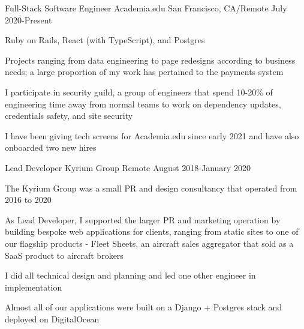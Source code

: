 

\begin{cventries}

  \cventry
    {Full-Stack Software Engineer}
    {Academia.edu}
    {San Francisco, CA/Remote}
    {July 2020-Present}
    {
      \begin{cvitems}
        \item {Ruby on Rails, React (with TypeScript), and Postgres}
        \item {
          Projects ranging from data engineering to page redesigns according to
          business needs; a large proportion of my work has pertained to the
          payments system
        }
        \item {
          I participate in security guild, a group of engineers that spend 10-20\% of
          engineering time away from normal teams to work on dependency updates,
          credentials safety, and site security
        }
        \item {
          I have been giving tech screens for Academia.edu since early 2021 and have also
          onboarded two new hires
        }
      \end{cvitems}
    }

  \cventry
    {Lead Developer}
    {Kyrium Group}
    {Remote}
    {August 2018-January 2020}
    {
      \begin{cvitems}
        \item {The Kyrium Group was a small PR and design consultancy that operated from 2016 to 2020}
        \item {
          As Lead Developer, I supported the larger PR and marketing operation by building bespoke
          web applications for clients, ranging from static sites to one of our flagship products -
          Fleet Sheets, an aircraft sales aggregator that sold as a SaaS product to aircraft brokers
        }
        \item {
          I did all technical design and planning and led one other engineer in implementation
        }
        \item {
          Almost all of our applications were built on a Django + Postgres stack and deployed
          on DigitalOcean
        }
      \end{cvitems}
    }


\end{cventries}
